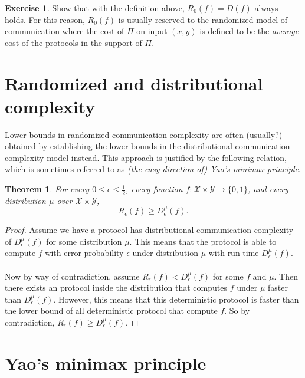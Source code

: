\documentclass[11pt,oneside]{book}
\theoremstyle{plain}
\newtheorem{theorem}{Theorem}
\theoremstyle{definition}
\newtheorem{exercise}{Exercise}
\theoremstyle{plain}
\newcommand{\calX}{\mathcal{X}}
\newcommand{\calY}{\mathcal{Y}}
\begin{document}
\begin{exercise}
	Show that with the definition above, $R_0(f) = D(f)$ always holds. For this reason, $R_0(f)$ is usually reserved to the randomized model of communication where the cost of $\Pi$ on input $(x,y)$ is defined to be the \emph{average} cost of the protocols in the support of $\Pi$.
\end{exercise}


 
\section{Randomized and distributional complexity}

Lower bounds in randomized communication complexity are often (usually?) obtained by establishing the lower bounds in the distributional communication complexity model instead. This approach is justified by the following relation, which is sometimes referred to as \emph{(the easy direction of) Yao's minimax principle}.

\begin{theorem}
	For every $0 \le \epsilon \le \frac12$, every function $f : \calX \times \calY \to \{0,1\}$, and every distribution $\mu$ over $\calX \times \calY$,
	\[
	R_\epsilon(f) \ge D_\epsilon^\mu(f).
	\]
\end{theorem}

\begin{proof}
	Assume we have a protocol has distributional communication complexity of $D_\epsilon^\mu(f)$ for some distribution $\mu$. This means that the protocol is able to compute $f$ with error probability $\epsilon$ under distribution $\mu$ with run time $D_\epsilon^\mu(f)$. \\
	\\
	Now by way of contradiction, assume $R_\epsilon(f) < D_\epsilon^\mu(f)$ for some $f$ and $\mu$. Then there exists an protocol inside the distribution that computes $f$ under $\mu$ faster than $D_\epsilon^\mu(f)$. However, this means that this deterministic protocol is faster than the lower bound of all deterministic protocol that compute $f$. So by contradiction, $R_\epsilon(f) \ge D_\epsilon^\mu(f)$.
\end{proof}


 
\section{Yao's minimax principle}
\end{document}
